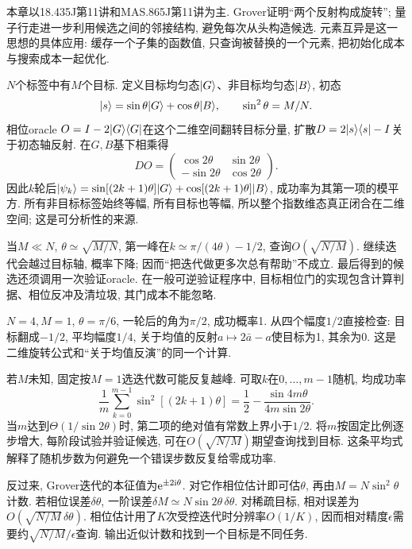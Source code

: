 本章以18.435J第11讲和MAS.865J第11讲为主. Grover证明“两个反射构成旋转”; 量子行走进一步利用候选之间的邻接结构, 避免每次从头构造候选. 元素互异是这一思想的具体应用: 缓存一个子集的函数值, 只查询被替换的一个元素, 把初始化成本与搜索成本一起优化.

$N$个标签中有$M$个目标. 定义目标均匀态$\lvert G\rangle$、非目标均匀态$\lvert B\rangle$, 初态
\[\lvert s\rangle=\sin\theta\lvert G\rangle+\cos\theta\lvert B\rangle,\qquad \sin^2\theta=M/N.\]
相位oracle $O=I-2\lvert G\rangle\langle G\rvert$在这个二维空间翻转目标分量, 扩散$D=2\lvert s\rangle\langle s\rvert-I$关于初态轴反射. 在$G,B$基下相乘得
\[DO=\begin{pmatrix}\cos2\theta&\sin2\theta\\-\sin2\theta&\cos2\theta\end{pmatrix}.\]
因此$k$轮后$\lvert \psi_k\rangle=\sin[(2k+1)\theta]\lvert G\rangle+\cos[(2k+1)\theta]\lvert B\rangle$, 成功率为其第一项的模平方. 所有非目标标签始终等幅, 所有目标也等幅, 所以整个指数维态真正闭合在二维空间; 这是可分析性的来源.

当$M\ll N$, $\theta\simeq\sqrt{M/N}$, 第一峰在$k\simeq\pi/(4\theta)-1/2$, 查询$O(\sqrt{N/M})$. 继续迭代会越过目标轴, 概率下降; 因而“把迭代做更多次总有帮助”不成立. 最后得到的候选还须调用一次验证oracle. 在一般可逆验证程序中, 目标相位门的实现包含计算判据、相位反冲及清垃圾, 其门成本不能忽略.

\begin{example}$N=4,M=1$, $\theta=\pi/6$, 一轮后的角为$\pi/2$, 成功概率1. 从四个幅度$1/2$直接检查: 目标翻成$-1/2$, 平均幅度$1/4$, 关于均值的反射$a\mapsto2\bar a-a$使目标为1, 其余为0. 这是二维旋转公式和“关于均值反演”的同一个计算.\end{example}

若$M$未知, 固定按$M=1$选迭代数可能反复越峰. 可取$k$在$0,\ldots,m-1$随机, 均成功率
\[\frac1m\sum_{k=0}^{m-1}\sin^2[(2k+1)\theta]
=\frac12-\frac{\sin4m\theta}{4m\sin2\theta}.\]
当$m$达到$\Theta(1/\sin2\theta)$时, 第二项的绝对值有常数上界小于$1/2$. 将$m$按固定比例逐步增大, 每阶段试验并验证候选, 可在$O(\sqrt{N/M})$期望查询找到目标. 这条平均式解释了随机步数为何避免一个错误步数反复给零成功率.

反过来, Grover迭代的本征值为$\mathrm e^{\pm2\mathrm i\theta}$. 对它作相位估计即可估$\theta$, 再由$M=N\sin^2\theta$计数. 若相位误差$\delta\theta$, 一阶误差$\delta M\simeq N\sin2\theta\,\delta\theta$. 对稀疏目标, 相对误差为$O(\sqrt{N/M}\,\delta\theta)$. 相位估计用了$K$次受控迭代时分辨率$O(1/K)$, 因而相对精度$\epsilon$需要约$\sqrt{N/M}/\epsilon$查询. 输出近似计数和找到一个目标是不同任务.

